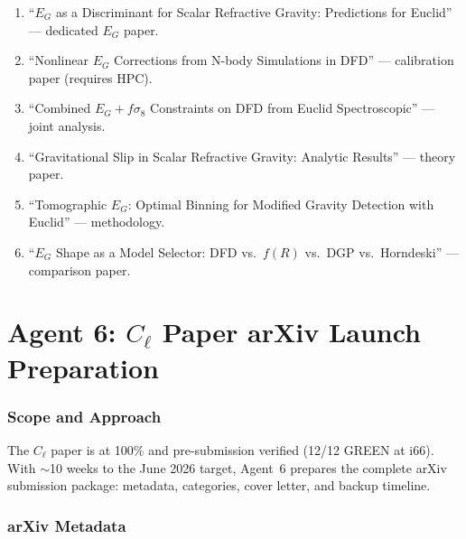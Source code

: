 \documentclass[11pt,a4paper]{article}
\begin{document}
\begin{enumerate}
\item ``$E_G$ as a Discriminant for Scalar Refractive Gravity: Predictions for Euclid'' --- dedicated $E_G$ paper.
\item ``Nonlinear $E_G$ Corrections from N-body Simulations in DFD'' --- calibration paper (requires HPC).
\item ``Combined $E_G + f\sigma_8$ Constraints on DFD from Euclid Spectroscopic'' --- joint analysis.
\item ``Gravitational Slip in Scalar Refractive Gravity: Analytic Results'' --- theory paper.
\item ``Tomographic $E_G$: Optimal Binning for Modified Gravity Detection with Euclid'' --- methodology.
\item ``$E_G$ Shape as a Model Selector: DFD vs.\ $f(R)$ vs.\ DGP vs.\ Horndeski'' --- comparison paper.
\end{enumerate}


\part{Agent 6: $C_\ell$ Paper arXiv Launch Preparation}
\label{part:cell-launch}

\section{Scope and Approach}

The $C_\ell$ paper is at 100\% and pre-submission verified (12/12 GREEN at i66). With $\sim$10 weeks to the June 2026 target, Agent~6 prepares the complete arXiv submission package: metadata, categories, cover letter, and backup timeline.

\section{arXiv Metadata}
\end{document}
